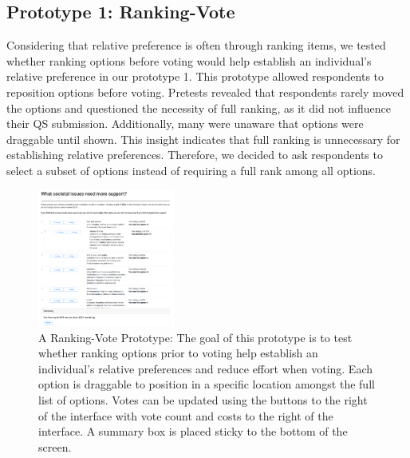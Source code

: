 \subsection{Prototype 1: Ranking-Vote}
Considering that relative preference is often through ranking items, we tested whether ranking options before voting would help establish an individual's relative preference in our prototype 1. This prototype allowed respondents to reposition options before voting. Pretests revealed that respondents rarely moved the options and questioned the necessity of full ranking, as it did not influence their QS submission. Additionally, many were unaware that options were draggable until shown. This insight indicates that full ranking is unnecessary for establishing relative preferences. Therefore, we decided to ask respondents to select a subset of options instead of requiring a full rank among all options.

\begin{figure}[ht]
    \centering
    \includegraphics[width=0.4\textwidth]{content/image/prototypes/2_ranking.png}
    \caption{A Ranking-Vote Prototype: The goal of this prototype is to test whether ranking options prior to voting help establish an individual's relative preferences and reduce effort when voting. Each option is draggable to position in a specific location amongst the full list of options. Votes can be updated using the buttons to the right of the interface with vote count and costs to the right of the interface. A summary box is placed sticky to the bottom of the screen.}
    \label{fig:qv_rank}
\end{figure}

